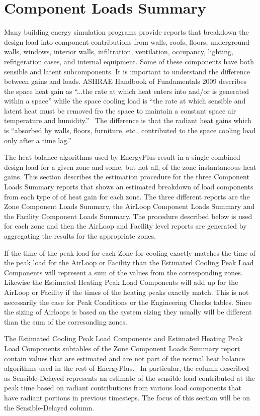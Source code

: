 \section{Component Loads Summary}\label{component-loads-summary}

Many building energy simulation programs provide reports that breakdown the design load into component contributions from walls, roofs, floors, underground walls, windows, interior walls, infiltration, ventilation, occupancy, lighting, refrigeration cases, and internal equipment. Some of these components have both sensible and latent subcomponents. It is important to understand the difference between gains and loads. ASHRAE Handbook of Fundamentals 2009 describes the space heat gain as ``...the rate at which heat enters into and/or is generated within a space'' while the space cooling load is ``the rate at which sensible and latent heat must be removed fro the space to maintain a constant space air temperature and humidity.''~ The difference is that the radiant heat gains which is ``absorbed by walls, floors, furniture, etc., contributed to the space cooling load only after a time lag.''

The heat balance algorithms used by EnergyPlus result in a single combined design load for a given zone and some, but not all, of the zone instantaneous heat gains. This section describes the estimation procedure for the three Component Loads Summary reports that shows an estimated breakdown of load components from each type of of heat gain for each zone. The three different reports are the Zone Component Loads Summary, the AirLoop Component Loads Summary and the Facility Component Loads Summary. The procedure described below is used for each zone and then the AirLoop and Facility level reports are generated by aggregating the results for the appropriate zones.

If the time of the peak load for each Zone for cooling exactly matches the time of the peak load for the AirLoop or Facility than the Estimated Cooling Peak Load Components will represent a sum of the values from the corresponding zones. Likewise the Estimated Heating Peak Load Components will add up for the AirLoop or Facility if the times of the heating peaks exactly match. This is not necessarily the case for Peak Conditions or the Engineering Checks tables. Since the sizing of Airloops is based on the system sizing they usually will be different than the sum of the corresonding zones. 

The Estimated Cooling Peak Load Components and Estimated Heating Peak Load Components subtables of the Zone Component Loads Summary report contain values that are estimated and are not part of the normal heat balance algorithms used in the rest of EnergyPlus.~ In particular, the column described as Sensible-Delayed represents an estimate of the sensible load contributed at the peak time based on radiant contributions from various load components that have radiant portions in previous timesteps. The focus of this section will be on the Sensible-Delayed column.

